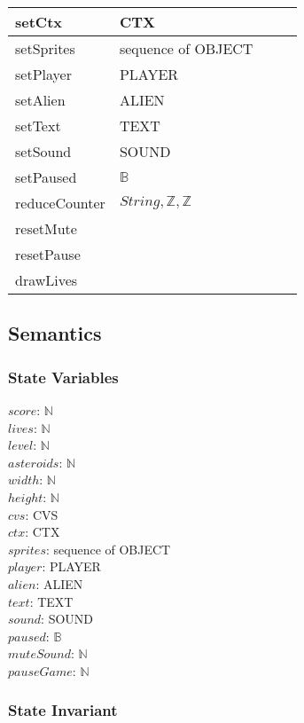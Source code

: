 \documentclass[12pt]{article}
\begin{document}
\begin{tabular}{| l | l | l | l |}
\hline
setCtx & CTX &  & ~\\
\hline
setSprites & sequence of OBJECT &  & ~\\
\hline
setPlayer & PLAYER &  & ~\\
\hline
setAlien & ALIEN &  & ~\\
\hline
setText & TEXT &  & ~\\
\hline
setSound & SOUND &  & ~\\
\hline
setPaused & $\mathbb{B}$ &  & ~\\
\hline
reduceCounter & $String, \mathbb{Z}, \mathbb{Z}$ &  & ~\\
\hline
resetMute &  &  & ~\\
\hline
resetPause &  &  & ~\\
\hline
drawLives &  &  & ~\\
\hline
\end{tabular}

\subsection*{Semantics}

\subsubsection*{State Variables}

$score$: $\mathbb{N}$\\
$lives$: $\mathbb{N}$\\
$level$: $\mathbb{N}$\\
$asteroids$: $\mathbb{N}$\\
$width$: $\mathbb{N}$\\
$height$: $\mathbb{N}$\\
$cvs$: CVS\\
$ctx$: CTX\\
$sprites$: sequence of OBJECT\\
$player$: PLAYER\\
$alien$: ALIEN\\
$text$: TEXT\\
$sound$: SOUND\\
$paused$: $\mathbb{B}$\\
$muteSound$: $\mathbb{N}$\\
$pauseGame$: $\mathbb{N}$\\

\subsubsection*{State Invariant}
\end{document}
